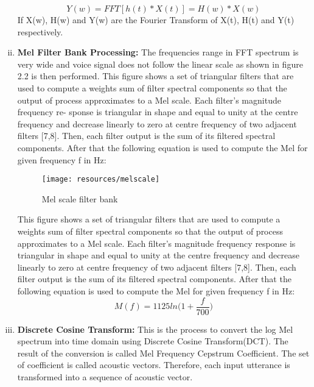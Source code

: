 \begin{enumerate}[(i)]
                \begin{equation}
                        Y(w) = FFT[h(t)*X(t)] = H(w) * X(w)
                \end{equation}
                If X(w), H(w) and Y(w) are the Fourier Transform of X(t), H(t) and Y(t) respectively.
        \item \textbf{Mel Filter Bank Processing:}
                The frequencies range in FFT spectrum is very wide
                and voice signal does not follow the linear scale as shown in figure 2.2 is then
                performed. This figure shows a set of triangular filters that are used to
                compute a weights sum of filter spectral components so that the output of
                process approximates to a Mel scale. Each filter’s magnitude frequency re-
                sponse is triangular in shape and equal to unity at the centre frequency and
                decrease linearly to zero at centre frequency of two adjacent filters [7,8].
                Then, each filter output is the sum of its filtered spectral components. After
                that the following equation is used to compute the Mel for given frequency
                f in Hz:
                \begin{figure}[h!]
                        \centering
                        \texttt{[image: resources/melscale]}
                        \caption{Mel scale filter bank}
                        \label{fig:Melscale}
                \end{figure}
                This figure shows a set of triangular filters that are used to compute a weights sum of filter spectral components so that the output
                of process approximates to a Mel scale. Each filter's magnitude frequency response is triangular in shape and equal to unity at the
                centre frequency and decrease linearly to zero at centre frequency of two adjacent filters [7,8]. Then, each filter output is the sum of its
                filtered spectral components. After that the following equation is used to compute the Mel for given frequency f in Hz:
                \begin{equation}
                        M(f) = 1125ln\Big(1+\frac{f}{700}\Big)
                \end{equation}
        \item \textbf{Discrete Cosine Transform:}
                This is the process to convert the log Mel spectrum into time domain using Discrete Cosine Transform(DCT). The result of the conversion is
                called Mel Frequency Cepstrum Coefficient. The set of coefficient is called acoustic vectors. Therefore, each input utterance is transformed
                into a sequence of acoustic vector.
\end{enumerate}

